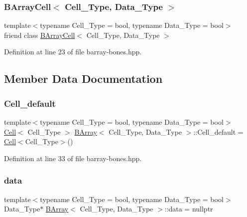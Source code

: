 \subsubsection{\texorpdfstring{B\+Array\+Cell$<$ Cell\+\_\+\+Type, Data\+\_\+\+Type $>$}{BArrayCell< Cell\_Type, Data\_Type >}}
{\footnotesize\ttfamily template$<$typename Cell\+\_\+\+Type = bool, typename Data\+\_\+\+Type = bool$>$ \\
friend class \hyperlink{class_b_array_cell}{B\+Array\+Cell}$<$ Cell\+\_\+\+Type, Data\+\_\+\+Type $>$\hspace{0.3cm}{\ttfamily [friend]}}



Definition at line 23 of file barray-\/bones.\+hpp.



\subsection{Member Data Documentation}
\mbox{\label{class_b_array_a5700cd9bb3814f84c62dda0ea47931bc}} 
\subsubsection{\texorpdfstring{Cell\+\_\+default}{Cell\_default}}
{\footnotesize\ttfamily template$<$typename Cell\+\_\+\+Type = bool, typename Data\+\_\+\+Type = bool$>$ \\
\hyperlink{class_cell}{Cell}$<$ Cell\+\_\+\+Type $>$ \hyperlink{class_b_array}{B\+Array}$<$ Cell\+\_\+\+Type, Data\+\_\+\+Type $>$\+::Cell\+\_\+default = \hyperlink{class_cell}{Cell}$<$Cell\+\_\+\+Type$>$()\hspace{0.3cm}{\ttfamily [static]}}



Definition at line 33 of file barray-\/bones.\+hpp.

\mbox{\label{class_b_array_a9576163b52124021575e50dbcca2f6b9}} 
\subsubsection{\texorpdfstring{data}{data}}
{\footnotesize\ttfamily template$<$typename Cell\+\_\+\+Type = bool, typename Data\+\_\+\+Type = bool$>$ \\
Data\+\_\+\+Type$\ast$ \hyperlink{class_b_array}{B\+Array}$<$ Cell\+\_\+\+Type, Data\+\_\+\+Type $>$\+::data = nullptr}



